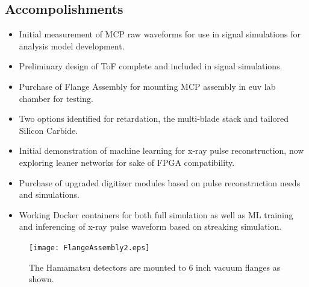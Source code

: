 \documentclass[aps]{revtex4}
\begin{document}
\subsection*{Accompolishments}
\begin{itemize}
\item Initial measurement of MCP raw waveforms for use in signal simulations for analysis model development.
\item Preliminary design of ToF complete and included in signal simulations.
\item Purchase of Flange Assembly for mounting MCP assembly in euv lab chamber for testing.
\item Two options identified for retardation, the multi-blade stack and tailored Silicon Carbide.
\item Initial demonstration of machine learning for x-ray pulse reconstruction, now exploring leaner networks for sake of FPGA compatibility.
\item Purchase of upgraded digitizer modules based on pulse reconstruction needs and simulations.
\item Working Docker containers for both full simulation as well as ML training and inferencing of x-ray pulse waveform based on streaking simulation.
\end{itemize}

\begin{figure}
\centerline{\texttt{[image: FlangeAssembly2.eps]}}
\caption{\label{fig::taran}
The Hamamatsu detectors are mounted to 6 inch vacuum flanges as shown.
}
\end{figure}



\end{document}
